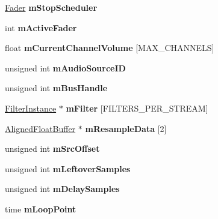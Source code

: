 \begin{DoxyCompactItemize}
\mbox{\label{class_so_loud_1_1_audio_source_instance_aa57af3fbb565943a96dcbf5fdd896d01}} 
\mbox{\hyperlink{class_so_loud_1_1_fader}{Fader}} {\bfseries m\+Stop\+Scheduler}
\item 
\mbox{\label{class_so_loud_1_1_audio_source_instance_adb1dc272751b38268aab744ad1eec5bc}} 
int {\bfseries m\+Active\+Fader}
\item 
\mbox{\label{class_so_loud_1_1_audio_source_instance_a8179d47567eff8b07a714008a0a66a62}} 
float {\bfseries m\+Current\+Channel\+Volume} \mbox{[}M\+A\+X\+\_\+\+C\+H\+A\+N\+N\+E\+LS\mbox{]}
\item 
\mbox{\label{class_so_loud_1_1_audio_source_instance_a2ba43540b8967d86c7fc89bfa0dd3eee}} 
unsigned int {\bfseries m\+Audio\+Source\+ID}
\item 
\mbox{\label{class_so_loud_1_1_audio_source_instance_a74029328e5ae36b2b784ff04d9b18acf}} 
unsigned int {\bfseries m\+Bus\+Handle}
\item 
\mbox{\label{class_so_loud_1_1_audio_source_instance_a92c5642b02d67061b7e9809a9984c445}} 
\mbox{\hyperlink{class_so_loud_1_1_filter_instance}{Filter\+Instance}} $\ast$ {\bfseries m\+Filter} \mbox{[}F\+I\+L\+T\+E\+R\+S\+\_\+\+P\+E\+R\+\_\+\+S\+T\+R\+E\+AM\mbox{]}
\item 
\mbox{\label{class_so_loud_1_1_audio_source_instance_a11747a2bae39924b1003251e9af131f8}} 
\mbox{\hyperlink{class_so_loud_1_1_aligned_float_buffer}{Aligned\+Float\+Buffer}} $\ast$ {\bfseries m\+Resample\+Data} \mbox{[}2\mbox{]}
\item 
\mbox{\label{class_so_loud_1_1_audio_source_instance_a41f9ed9f40b5b3602fc335491a0443c2}} 
unsigned int {\bfseries m\+Src\+Offset}
\item 
\mbox{\label{class_so_loud_1_1_audio_source_instance_a77e7ccc37e72c9a5ab812639f7f59dcb}} 
unsigned int {\bfseries m\+Leftover\+Samples}
\item 
\mbox{\label{class_so_loud_1_1_audio_source_instance_a326bc9edb5b29c92a6a855a72c3e38f9}} 
unsigned int {\bfseries m\+Delay\+Samples}
\item 
\mbox{\label{class_so_loud_1_1_audio_source_instance_a2181a1a15315f3450e51161c2b35e21e}} 
time {\bfseries m\+Loop\+Point}
\end{DoxyCompactItemize}


